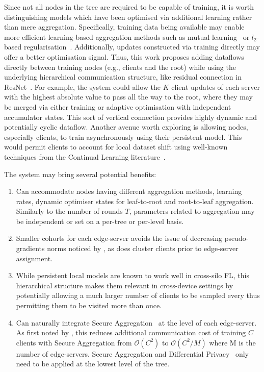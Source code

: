 Since not all nodes in the tree are required to be capable of training, it is worth distinguishing models which have been optimised via additional learning rather than mere aggregation. Specifically, training data being available may enable more efficient learning-based aggregation methods such as mutual learning~\citep{DeepMutualLearning} or $l_2$-based regularisation~\citep{Ditto}. Additionally, updates constructed via training directly may offer a better optimisation signal. Thus, this work proposes adding dataflows directly between training nodes (e.g., clients and the root) while using the underlying hierarchical communication structure, like residual connection in ResNet~\citep{ResNet}. For example, the system could allow the $K$ client updates of each server with the highest absolute value to pass all the way to the root, where they may be merged via either training or adaptive optimisation with independent accumulator states. This sort of vertical connection provides highly dynamic and potentially cyclic dataflow. Another avenue worth exploring is allowing nodes, especially clients, to train asynchronously using their persistent model. This would permit clients to account for local dataset shift using well-known techniques from the Continual Learning literature~\citep{ContinualLearningSurvey,LearningWithoutForgetting,kirkpatrick2017overcoming}.

The system may bring several potential benefits:
\begin{enumerate}
    \item Can accommodate nodes having different aggregation methods, learning rates, dynamic optimiser states for leaf-to-root and root-to-leaf aggregation. Similarly to the number of rounds $T$, parameters related to aggregation may be independent or set on a per-tree or per-level basis.
    \item Smaller cohorts for each edge-server avoids the issue of decreasing pseudo-gradients norms noticed by \citet{LargeCohorts}, as does cluster clients prior to edge-server assignment.
    \item While persistent local models are known to work well in cross-silo FL, this hierarchical structure makes them relevant in cross-device settings by potentially allowing a much larger number of clients to be sampled every thus permitting them to be visited more than once.
    \item Can naturally integrate Secure Aggregation~\citep{SecAggOG,FastSecAgg} at the level of each edge-server. As first noted by \citet{ScaleSystemDesign}, this reduces additional communication cost of training $C$ clients with Secure Aggregation from $\mathcal{O}(C^2)$ to $\mathcal{O}(C^2/M)$ where M is the number of edge-servers. Secure Aggregation and Differential Privacy~\citep{DiffPrivacyFL} only need to be applied at the lowest level of the tree.

\end{enumerate}

